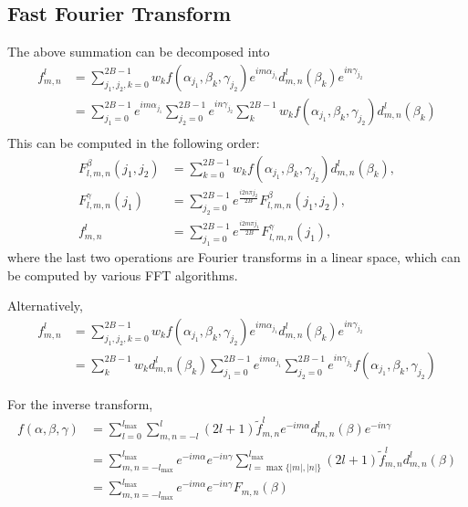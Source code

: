 \documentclass[onecolumn,11pt]{IEEEtran}
\begin{document}
\subsection{Fast Fourier Transform}
The above summation can be decomposed into
\begin{align*}
f^l_{m,n}&=\sum_{j_1,j_2,k=0}^{2B-1} w_k f(\alpha_{j_1},\beta_k,\gamma_{j_2})
e^{im\alpha_{j_1}} d^l_{m,n}(\beta_k) e^{in\gamma_{j_2}}\\
&=\sum_{j_1=0}^{2B-1} 
e^{im\alpha_{j_1}}\sum_{j_2=0}^{2B-1} e^{in\gamma_{j_2}} \sum_{k}^{2B-1}w_k f(\alpha_{j_1},\beta_k,\gamma_{j_2})d^l_{m,n}(\beta_k) \\
\end{align*}
This can be computed in the following order:
\begin{align*}
F^{\beta}_{l,m,n}(j_1,j_2)&=\sum_{k=0}^{2B-1}w_k f(\alpha_{j_1},\beta_k,\gamma_{j_2})d^l_{m,n}(\beta_k),\\
F^{\gamma}_{l,m,n}(j_1)&=\sum_{j_2=0}^{2B-1}e^{\frac{i 2 n \pi j_2}{2B}}F^{\beta}_{l,m,n}(j_1,j_2),\\
f^l_{m,n} & = \sum_{j_1=0}^{2B-1} e^{\frac{i 2 m\pi j_1}{2B}}F^{\gamma}_{l,m,n}(j_1),
\end{align*}
where the last two operations are Fourier transforms in a linear space, which can be computed by various FFT algorithms. 

Alternatively, 
\begin{align*}
    f^l_{m,n} & = \sum_{j_1,j_2,k=0}^{2B-1} w_k f(\alpha_{j_1},\beta_k,\gamma_{j_2})
    e^{im\alpha_{j_1}} d^l_{m,n}(\beta_k) e^{in\gamma_{j_2}}\\
    & =\sum_{k}^{2B-1}w_k d^l_{m,n}(\beta_k) \sum_{j_1=0}^{2B-1} 
    e^{im\alpha_{j_1}}\sum_{j_2=0}^{2B-1} e^{in\gamma_{j_2}}  f(\alpha_{j_1},\beta_k,\gamma_{j_2}) 
\end{align*}

For the inverse transform,
\begin{align*}
    f(\alpha,\beta,\gamma) & = \sum_{l=0}^{l_{\max}} \sum_{m,n=-l}^l (2l+1) \tilde f^l_{m,n} e^{-im\alpha} d^l_{m,n} (\beta) e^{-in\gamma}\\
                           & =\sum_{m,n=-l_{\max}}^{l_{\max}} e^{-im\alpha}  e^{-in\gamma} \sum_{l=\max\{|m|,|n|\}}^{l_{\max}} (2l+1) \tilde f^l_{m,n}  d^l_{m,n} (\beta) \\
                           & =\sum_{m,n=-l_{\max}}^{l_{\max}} e^{-im\alpha}  e^{-in\gamma} F_{m,n}(\beta)
\end{align*}
\end{document}
